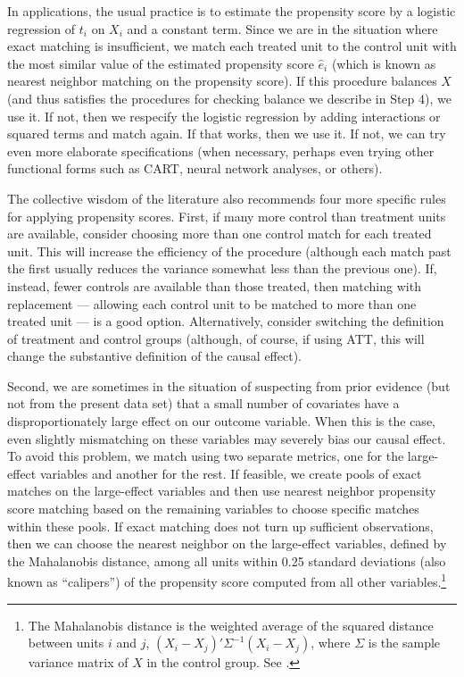\documentclass[11pt,titlepage]{article}
\begin{document}
In applications, the usual practice is to estimate the propensity
score by a logistic regression of $t_i$ on $X_i$ and a constant term.
Since we are in the situation where exact matching is insufficient, we
match each treated unit to the control unit with the most similar
value of the estimated propensity score $\hat{e}_i$ (which is known as
nearest neighbor matching on the propensity score).  If this procedure
balances $X$ (and thus satisfies the procedures for checking balance
we describe in Step 4), we use it.  If not, then we respecify the
logistic regression by adding interactions or squared terms and match
again.  If that works, then we use it.  If not, we can try even more
elaborate specifications (when necessary, perhaps even trying other
functional forms such as CART, neural network analyses, or others).

The collective wisdom of the literature also recommends four more
specific rules for applying propensity scores.  First, if many more
control than treatment units are available, consider choosing more
than one control match for each treated unit.  This will increase the
efficiency of the procedure (although each match past the first
usually reduces the variance somewhat less than the previous one).
If, instead, fewer controls are available than those treated, then
matching with replacement --- allowing each control unit to be matched
to more than one treated unit --- is a good option.  Alternatively,
consider switching the definition of treatment and control groups
(although, of course, if using ATT, this will change the substantive
definition of the causal effect).

Second, we are sometimes in the situation of suspecting from prior
evidence (but not from the present data set) that a small number of
covariates have a disproportionately large effect on our outcome
variable.  When this is the case, even slightly mismatching on these
variables may severely bias our causal effect.  To avoid this problem,
we match using two separate metrics, one for the large-effect
variables and another for the rest.  If feasible, we create pools of
exact matches on the large-effect variables and then use nearest
neighbor propensity score matching based on the remaining variables to
choose specific matches within these pools.  If exact matching does
not turn up sufficient observations, then we can choose the nearest
neighbor on the large-effect variables, defined by the Mahalanobis
distance, among all units within 0.25 standard deviations (also known
as ``calipers'') of the propensity score computed from all other
variables.\footnote{The Mahalanobis distance is the weighted average
  of the squared distance between units $i$ and $j$,
  $(X_i-X_j)'\Sigma^{-1}(X_i-X_j)$, where $\Sigma$ is the sample
  variance matrix of $X$ in the control group.  See \cite{RubTho00}.}
\end{document}
